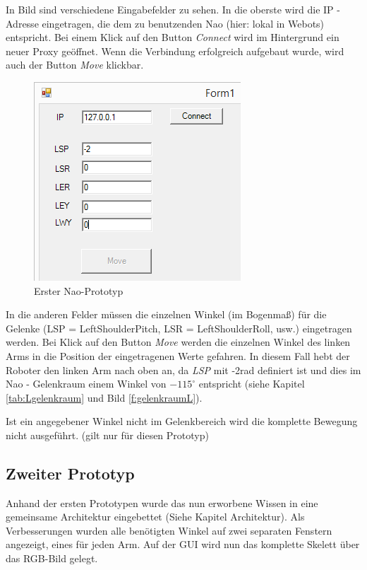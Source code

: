 In Bild  sind verschiedene Eingabefelder zu sehen. In die oberste wird die IP - Adresse eingetragen, die dem zu benutzenden Nao (hier: lokal in Webots) entspricht. Bei einem Klick auf den Button \textit{Connect} wird im Hintergrund ein neuer Proxy geöffnet. Wenn die Verbindung erfolgreich aufgebaut wurde, wird auch der Button \textit{Move} klickbar.
\begin{figure}[H]						
	\centering							
	\includegraphics[scale=0.8]{Bilder/nao_prototyp1.PNG}
	\caption{Erster Nao-Prototyp}						
	\label{f:nao_prototyp1}						
\end{figure}
In die anderen Felder müssen die einzelnen Winkel (im Bogenmaß) für die Gelenke (LSP = LeftShoulderPitch, LSR = LeftShoulderRoll, usw.) eingetragen werden. Bei Klick auf den Button \textit{Move} werden die einzelnen Winkel des linken Arms in die Position der eingetragenen Werte gefahren. In diesem Fall hebt der Roboter den linken Arm nach oben an, da \textit{LSP} mit -2rad definiert ist und dies im Nao - Gelenkraum einem Winkel von $-115^{\circ}$ entspricht (siehe Kapitel \ref{tab:Lgelenkraum} und Bild \ref{f:gelenkraumL}). 

Ist ein angegebener Winkel nicht im Gelenkbereich wird die komplette Bewegung nicht ausgeführt. (gilt nur für diesen Prototyp)

\subsection{Zweiter Prototyp}
Anhand der ersten Prototypen wurde das nun erworbene Wissen in eine gemeinsame Architektur eingebettet (Siehe Kapitel Architektur). Als Verbesserungen wurden alle benötigten Winkel auf zwei separaten Fenstern angezeigt, eines für jeden Arm. Auf der GUI wird nun das komplette Skelett über das RGB-Bild gelegt.


